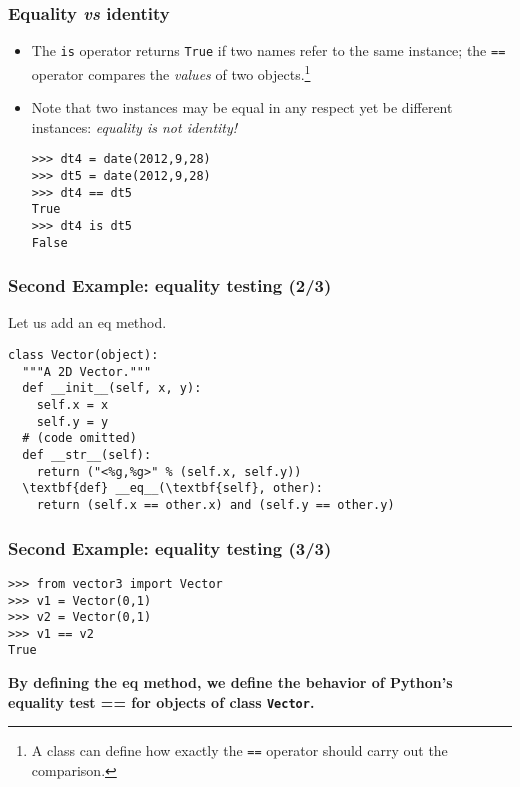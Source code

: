 \begin{frame}[fragile]\frametitle{Equality \emph{vs} identity}
  
  \begin{itemize}
\item  The \texttt{is} operator returns \texttt{True} if two names refer to
  the same instance; the \texttt{==} operator compares the
  \emph{values} of two objects.\footnote{A class can define how
    exactly the \texttt{==} operator should carry out the comparison.}

  \item  
  Note that two instances may be equal in any respect yet be
  different instances: \emph{equality is not identity!}
\begin{lstlisting}
>>> dt4 = date(2012,9,28)
>>> dt5 = date(2012,9,28)
>>> dt4 == dt5
True
>>> dt4 is dt5
False
\end{lstlisting}
\end{itemize}
\end{frame}

\begin{frame}[fragile]\frametitle{Second Example: equality testing (2/3)}
      Let us add an eq method.
\begin{lstlisting}
class Vector(object):
  """A 2D Vector."""
  def __init__(self, x, y):
    self.x = x
    self.y = y
  # (code omitted)
  def __str__(self):
    return ("<%g,%g>" % (self.x, self.y))
  \textbf{def} __eq__(\textbf{self}, other):
    return (self.x == other.x) and (self.y == other.y)
\end{lstlisting}
  

\end{frame}

\begin{frame}[fragile]\frametitle{Second Example: equality testing (3/3)}
\begin{lstlisting}
>>> from vector3 import Vector
>>> v1 = Vector(0,1)
>>> v2 = Vector(0,1)
>>> v1 == v2
True
\end{lstlisting}

   {\bfseries By defining the eq method, we
    define the behavior of Python's equality test == for
    objects of class \texttt{Vector}.}
\end{frame}

